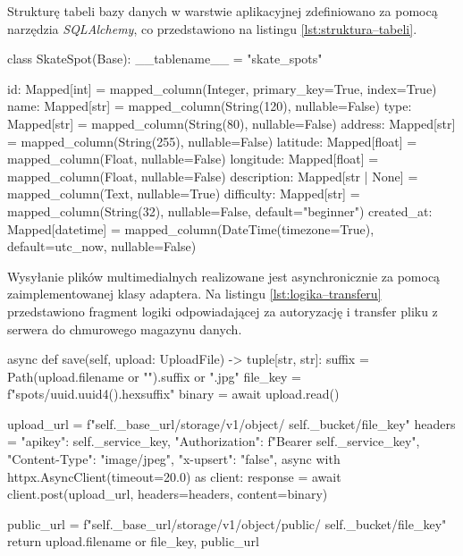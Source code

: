         Strukturę tabeli bazy danych w warstwie aplikacyjnej zdefiniowano za pomocą narzędzia \textit{SQLAlchemy}, co przedstawiono na listingu \ref{lst:struktura–tabeli}.

                \begin{code}[
                language=Python,
                caption={Struktura tabeli bazy danych.},
                label={lst:struktura–tabeli}
            ]
class SkateSpot(Base):
    __tablename__ = "skate_spots"

    id: Mapped[int] = mapped_column(Integer, primary_key=True, index=True)
    name: Mapped[str] = mapped_column(String(120), nullable=False)
    type: Mapped[str] = mapped_column(String(80), nullable=False)
    address: Mapped[str] = mapped_column(String(255), nullable=False)
    latitude: Mapped[float] = mapped_column(Float, nullable=False)
    longitude: Mapped[float] = mapped_column(Float, nullable=False)
    description: Mapped[str | None] = mapped_column(Text, nullable=True)
    difficulty: Mapped[str] = mapped_column(String(32), nullable=False,
    default="beginner")
    created_at: Mapped[datetime] = mapped_column(DateTime(timezone=True),
    default=utc_now, nullable=False)\end{code}  

        Wysyłanie plików multimedialnych realizowane jest asynchronicznie za pomocą zaimplementowanej klasy adaptera. Na listingu \ref{lst:logika–transferu} przedstawiono fragment logiki odpowiadającej za autoryzację i transfer pliku z serwera do chmurowego magazynu danych.

                        \begin{code}[
                language=Python,
                caption={Logika transferu plików.},
                label={lst:logika–transferu}
            ]
async def save(self, upload: UploadFile) -> tuple[str, str]:
    suffix = Path(upload.filename or "").suffix or ".jpg"
    file_key = f"spots/{uuid.uuid4().hex}{suffix}"
    binary = await upload.read()
    
    upload_url = f"{self._base_url}/storage/v1/object/
    {self._bucket}/{file_key}"
    headers = {
        "apikey": self._service_key,
        "Authorization": f"Bearer {self._service_key}",
        "Content-Type": "image/jpeg",
        "x-upsert": "false",
    }
    async with httpx.AsyncClient(timeout=20.0) as client:
        response = await client.post(upload_url,
        headers=headers, content=binary)
        
    public_url = f"{self._base_url}/storage/v1/object/public/
    {self._bucket}/{file_key}"
    return upload.filename or file_key, public_url\end{code} 

